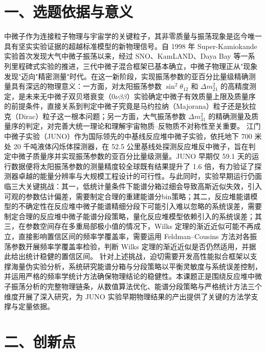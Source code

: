 
\section*{一、选题依据与意义}

中微子作为连接粒子物理与宇宙学的关键粒子，其非零质量与振荡现象是迄今唯一具有坚实实验证据的超越标准模型的新物理信号。自 1998 年 Super-Kamiokande 实验首次发现大气中微子振荡以来，经过 SNO、KamLAND、Daya Bay 等一系列里程碑式实验的推进，三代中微子混合框架已基本确立，中微子物理正从"现象发现"迈向"精密测量"时代。在这一新阶段，实现振荡参数的亚百分比量级精确测量具有深远的物理意义：一方面，对太阳振荡参数 $\sin^2\theta_{12}$ 和 $\Delta m^2_{21}$ 的高精度测定，是未来无中微子双贝塔衰变（$0\nu\beta\beta$）实验确定中微子有效质量上限及质量序的前提条件，直接关系到判定中微子究竟是马约拉纳（Majorana）粒子还是狄拉克（Dirac）粒子这一根本问题；另一方面，大气振荡参数 $\Delta m^2_{31}$ 的精确测量及质量序的判定，对完善大统一理论和理解宇宙物质--反物质不对称性至关重要。
江门中微子实验（JUNO）作为国际领先的中基线反应堆中微子实验，依托地下 700 米处 20 千吨液体闪烁体探测器，在 52.5 公里基线处探测反应堆反中微子，旨在判定中微子质量序并实现振荡参数的亚百分比量级测量。JUNO 早期仅 59.1 天的运行数据便将太阳振荡参数的测量精度较全球既有结果提升了 1.6 倍，有力验证了探测器卓越的能量分辨率与大规模工程设计的可行性。与此同时，实验早期运行仍面临三大关键挑战：其一，低统计量条件下能谱分箱过细会导致高斯近似失效，引入可观的参数估计偏差，需要制定合理的重建能谱分bin策略；其二，反应堆能谱模型的不确定性在反应堆中微子能谱精细分段下可能引入难以忽略的系统误差，需要制定合理的反应堆中微子能谱分段策略，量化反应堆模型依赖引入的系统误差；其三，在参数空间存在多重局部极小值的情况下，Wilks 定理的渐近近似可能不再成立，直接影响置信区间的频率学覆盖率，需要运用 Feldman--Cousins 方法对各振荡参数开展频率学覆盖率检验，判断 Wilks 定理的渐近近似是否仍然适用，并据此给出统计稳健的置信区间。
针对上述挑战，迫切需要开发高性能拟合框架以支撑海量伪实验分析，系统研究能谱分箱与分段策略以平衡灵敏度与系统误差控制，并运用严格的频率学统计方法确保物理结论的稳健性。本课题正是围绕反应堆中微子振荡分析的完整物理链条，从数值算法优化、能谱分段策略与严格统计方法三个维度开展了深入研究，为 JUNO 实验早期物理结果的产出提供了关键的方法学支撑与定量依据。


\section*{二、创新点}

